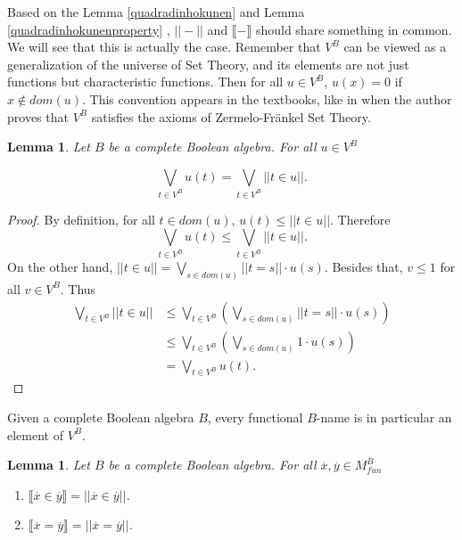 \documentclass[10pt,longbibliography]{article}
\newtheorem{Lemma}[Theo]{Lemma}
\newcommand{\ydot}{\overset{.}{y}}
\newcommand{\xdot}{\overset{.}{x}}
\newcommand{\lb}{\llbracket}
\newcommand{\rb}{\rrbracket}
\begin{document}
Based on the Lemma \ref{quadradinhokunen} and Lemma \ref{quadradinhokunenproperty} , $|| - ||$ and $ \lb - \rb$ should share something in common. We will see that this is actually the case. Remember that $V^B$ can be viewed as a generalization of the universe of Set Theory, and its elements are not just functions but characteristic functions. Then for all $u \in V^B$, $u(x) = 0$ if $x \not \in dom(u)$. This convention appears in the textbooks, like in  \cite{Bell05} when the author proves that $V^B$ satisfies the axioms of Zermelo-Fränkel Set Theory. 
\begin{Lemma}\label{pricipiodomaximo}
	Let $B$ be a complete Boolean algebra. For all $u \in V^B$
	
	$$\underset{t \in V^B}{\bigvee} u(t) = \underset{t \in V^B}{\bigvee} ||t \in u ||.$$
\end{Lemma}
\begin{proof}
	By definition, for all $t \in dom(u)$, $u(t) \leq || t \in u||$. Therefore
	$$\underset{t \in V^B}{\bigvee} u(t) \leq \underset{t \in V^B}{\bigvee} || t \in u ||.$$
	On the other hand, $|| t \in u|| = \underset{s \in dom(u)}{\bigvee} ||t = s||\cdot u(s)$. Besides that, $v \leq 1$ for all $v \in V^B$. Thus
	\begin{align*}
		\underset{t \in V^B}{\bigvee} || t \in u || &\leq \underset{t \in V^B}{\bigvee}\left(\underset{s \in dom(u)}{\bigvee} ||t= s|| \cdot u(s)\right) \\
		&\leq \underset{t \in V^B}{\bigvee}\left(\underset{s \in dom(u)}{\bigvee} 1 \cdot u(s)\right) \\
		& = \underset{t \in V^B}{\bigvee} u(t).
	\end{align*}
\end{proof}

Given a complete Boolean algebra $B$, every functional $B$-name is in particular an element of $V^B$.
\begin{Lemma}\label{Equalityofboolanvalues}
	Let $B$ be a complete Boolean algebra. For all $\xdot, \ydot \in M^{B}_{fun}$
	\begin{enumerate}
		\item $\lb \xdot \in \ydot \rb = || \xdot \in \ydot ||$.
		\item $\lb \xdot = \ydot \rb = || \xdot = \ydot ||$.
	\end{enumerate}
\end{Lemma}
\end{document}

